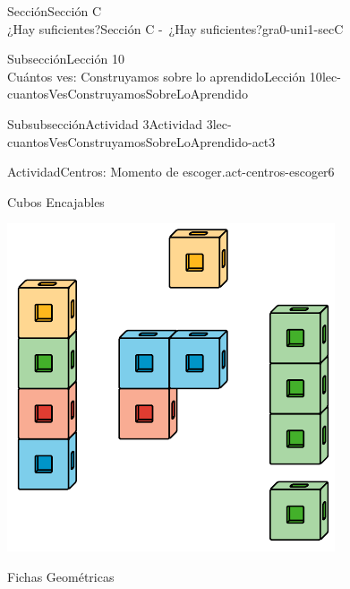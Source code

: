 \begin{sectionptx}{Sección}{{\Large Sección C\\}¿Hay suficientes?}{}{Sección C -~¿Hay suficientes?}{}{}{gra0-uni1-secC}
\begin{subsectionptx}{Subsección}{{\normalsize Lección 10\\[-0.05cm]}Cuántos ves: Construyamos sobre lo aprendido}{}{Lección 10}{}{}{lec-cuantosVesConstruyamosSobreLoAprendido}
\begin{subsubsectionptx}{Subsubsección}{Actividad 3}{}{Actividad 3}{}{}{lec-cuantosVesConstruyamosSobreLoAprendido-act3}
\begin{activity}{Actividad}{Centros: Momento de escoger.}{act-centros-escoger6}
\begin{sidebyside}{2}{0.025}{0.025}{0.05}
\begin{sbspanel}{0.45}%
Cubos Encajables%
\par
\includegraphics[max width=\linewidth, center]{external/svg-source/tikz-file-128850.pdf}
\end{sbspanel}%
\begin{sbspanel}{0.45}%
Fichas Geométricas%
\par

\end{sbspanel}
\end{sidebyside}
\end{activity}
\end{subsubsectionptx}
\end{subsectionptx}
\end{sectionptx}
